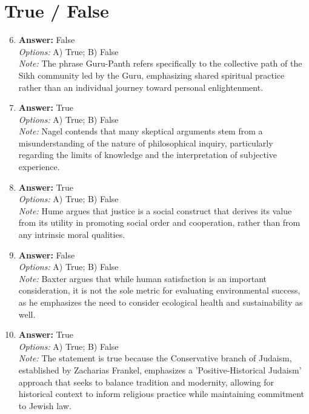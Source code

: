 \documentclass[12pt]{article}
\begin{document}
\section*{True / False}
\begin{enumerate}[label=\arabic*.]
\setcounter{enumi}{5}
\item \textbf{Answer:} False
\\ \textit{Options:} A) True; B) False
\\ \textit{Note:} The phrase Guru-Panth refers specifically to the collective path of the Sikh community led by the Guru, emphasizing shared spiritual practice rather than an individual journey toward personal enlightenment.
\item \textbf{Answer:} True
\\ \textit{Options:} A) True; B) False
\\ \textit{Note:} Nagel contends that many skeptical arguments stem from a misunderstanding of the nature of philosophical inquiry, particularly regarding the limits of knowledge and the interpretation of subjective experience.
\item \textbf{Answer:} True
\\ \textit{Options:} A) True; B) False
\\ \textit{Note:} Hume argues that justice is a social construct that derives its value from its utility in promoting social order and cooperation, rather than from any intrinsic moral qualities.
\item \textbf{Answer:} False
\\ \textit{Options:} A) True; B) False
\\ \textit{Note:} Baxter argues that while human satisfaction is an important consideration, it is not the sole metric for evaluating environmental success, as he emphasizes the need to consider ecological health and sustainability as well.
\item \textbf{Answer:} True
\\ \textit{Options:} A) True; B) False
\\ \textit{Note:} The statement is true because the Conservative branch of Judaism, established by Zacharias Frankel, emphasizes a 'Positive-Historical Judaism' approach that seeks to balance tradition and modernity, allowing for historical context to inform religious practice while maintaining commitment to Jewish law.
\end{enumerate}
\end{document}
